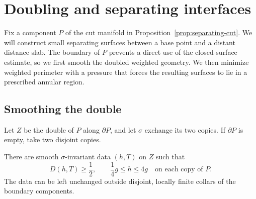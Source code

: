 \section{Doubling and separating interfaces}\label{sec:doubling-bubbles}

Fix a component $P$ of the cut manifold in
Proposition~\ref{prop:separating-cut}.  We will construct small separating
surfaces between a base point and a distant distance slab.  The boundary
of $P$ prevents a direct use of the closed-surface estimate, so we first
smooth the doubled weighted geometry.  We then minimize weighted
perimeter with a pressure that forces the resulting surfaces to lie in
a prescribed annular region.

\subsection{Smoothing the double}

Let $Z$ be the double of $P$ along $\partial P$, and let $\sigma$ exchange
its two copies.  If $\partial P$ is empty, take two disjoint copies.

\begin{lemma}\label{lem:double-smoothing}
There are smooth $\sigma$-invariant data $(h,T)$ on $Z$ such that
\begin{equation}\label{eq:double-comparison}
 D(h,T)\ge\frac12,
 \qquad \frac14g\le h\le4g
 \quad\text{on each copy of }P.
\end{equation}
The data can be left unchanged outside disjoint, locally finite collars
of the boundary components.
\end{lemma}

